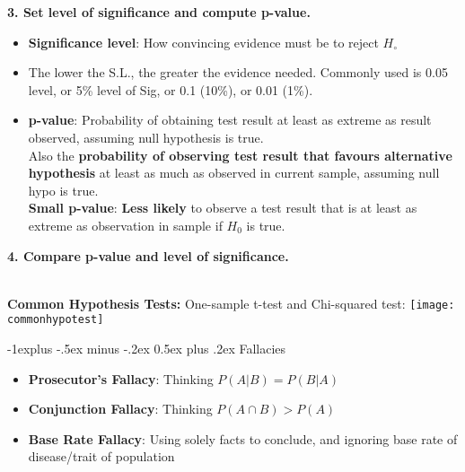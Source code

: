 \documentclass[10pt, landscape]{article}
\makeatletter
\renewcommand{\subsection}{\@startsection{subsection}{2}{0mm}%
                                {-1explus -.5ex minus -.2ex}%
                                {0.5ex plus .2ex}%
                                {\normalfont\normalsize\bfseries}}
\makeatother
\begin{document}
\begin{multicols*}{4}
	{\small \textbf{3. Set level of significance and compute p-value.} \\ }
	\begin{itemize}
	\item \textbf{Significance level}: How convincing evidence must be to reject $H_\circ$ 
	\item The lower the S.L., the greater the evidence needed. Commonly used is 0.05 level, or 5\% level of Sig, or 0.1 (10\%), or 0.01 (1\%).
	\item \textbf{p-value}: Probability of obtaining test result at least as extreme as result observed, assuming null hypothesis is true. \\
	Also the \textbf{probability of observing test result that favours alternative hypothesis} at least as much as observed in current sample, assuming null hypo is true.\\
     \textbf{Small p-value}: \textbf{Less likely} to observe a test result that is at least as extreme as observation in sample if $H_0$ is true.\\
\end{itemize}


	{\small \textbf{4. Compare p-value and level of significance.} }
 ~\\

	{\small \textbf{Common Hypothesis Tests:} }
One-sample t-test and Chi-squared test:
	\texttt{[image: commonhypotest]}

    \subsection{Fallacies}
    \begin{itemize}
        \item \textbf{Prosecutor's Fallacy}: Thinking $P(A|B) = P(B|A)$
        \item \textbf{Conjunction Fallacy}: Thinking $P(A \cap B) > P(A)$
        \item \textbf{Base Rate Fallacy}: Using solely facts to conclude, and ignoring base rate of disease/trait of population
    \end{itemize}
    

\end{multicols*}
\end{document}
